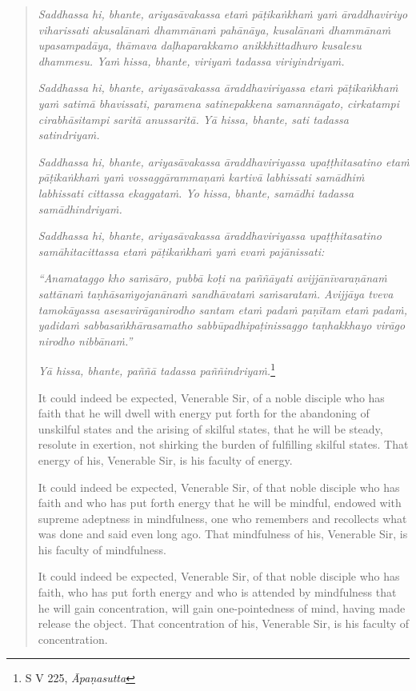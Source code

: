 \begin{quote}
\emph{Saddhassa hi, bhante, ariyasāvakassa etaṁ pāṭikaṅkhaṁ yaṁ āraddhaviriyo viharissati akusalānaṁ dhammānaṁ pahānāya, kusalānaṁ dhammānaṁ upasampadāya, thāmava daḷhaparakkamo anikkhittadhuro kusalesu dhammesu. Yaṁ hissa, bhante, viriyaṁ tadassa viriyindriyaṁ.}

\emph{Saddhassa hi, bhante, ariyasāvakassa āraddhaviriyassa etaṁ pāṭikaṅkhaṁ yaṁ satimā bhavissati, paramena satinepakkena samannāgato, cirkatampi cirabhāsitampi saritā anussaritā. Yā hissa, bhante, sati tadassa satindriyaṁ.}

\emph{Saddhassa hi, bhante, ariyasāvakassa āraddhaviriyassa upaṭṭhitasatino etaṁ pāṭikaṅkhaṁ yaṁ vossaggārammaṇaṁ kartivā labhissati samādhiṁ labhissati cittassa ekaggataṁ. Yo hissa, bhante, samādhi tadassa samādhindriyaṁ.}

\emph{Saddhassa hi, bhante, ariyasāvakassa āraddhaviriyassa upaṭṭhitasatino samāhitacittassa etaṁ pāṭikaṅkhaṁ yaṁ evaṁ pajānissati:}

\emph{``Anamataggo kho saṁsāro, pubbā koṭi na paññāyati avijjānīvaraṇānaṁ sattānaṁ taṇhāsaṁyojanānaṁ sandhāvataṁ saṁsarataṁ. Avijjāya tveva tamokāyassa asesavirāganirodho santam etaṁ padaṁ paṇītam etaṁ padaṁ, yadidaṁ sabbasaṅkhārasamatho sabbūpadhipaṭinissaggo taṇhakkhayo virāgo nirodho nibbānaṁ.''}

\emph{Yā hissa, bhante, paññā tadassa paññindriyaṁ.}\footnote{S V 225, \emph{Āpaṇasutta}}

It could indeed be expected, Venerable Sir, of a noble disciple who has faith that he will dwell with energy put forth for the abandoning of unskilful states and the arising of skilful states, that he will be steady, resolute in exertion, not shirking the burden of fulfilling skilful states. That energy of his, Venerable Sir, is his faculty of energy.

It could indeed be expected, Venerable Sir, of that noble disciple who has faith and who has put forth energy that he will be mindful, endowed with supreme adeptness in mindfulness, one who remembers and recollects what was done and said even long ago. That mindfulness of his, Venerable Sir, is his faculty of mindfulness.

It could indeed be expected, Venerable Sir, of that noble disciple who has faith, who has put forth energy and who is attended by mindfulness that he will gain concentration, will gain one-pointedness of mind, having made release the object. That concentration of his, Venerable Sir, is his faculty of concentration.


\end{quote}

